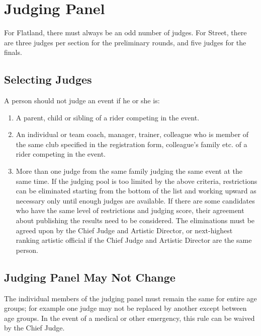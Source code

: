 \section{Judging Panel}
For Flatland, there must always be an odd number of judges.
For Street, there are three judges  per section for the preliminary rounds, and five judges for the finals.

\subsection{Selecting Judges}
A person should not judge an event if he or she is:
\begin{enumerate}
\item A parent, child or sibling of a rider competing in the event.
\item An individual or team coach, manager, trainer, colleague who is member of the same club specified in the registration form, colleague's family etc. of a rider competing in the event.
\item More than one judge from the same family judging the same event at the same time.
If the judging pool is too limited by the above criteria, restrictions can be eliminated starting from the bottom of the list and working upward as necessary only until enough judges are available.
If there are some candidates who have the same level of restrictions and judging score, their agreement about publishing the results need to be considered.
The eliminations must be agreed upon by the Chief Judge and Artistic Director, or next-highest ranking artistic official if the Chief Judge and Artistic Director are the same person.
\end{enumerate}

\subsection{Judging Panel May Not Change}
The individual members of the judging panel must remain the same for entire age groups; for example one judge may not be replaced by another except between age groups.
In the event of a medical or other emergency, this rule can be waived by the Chief Judge.

